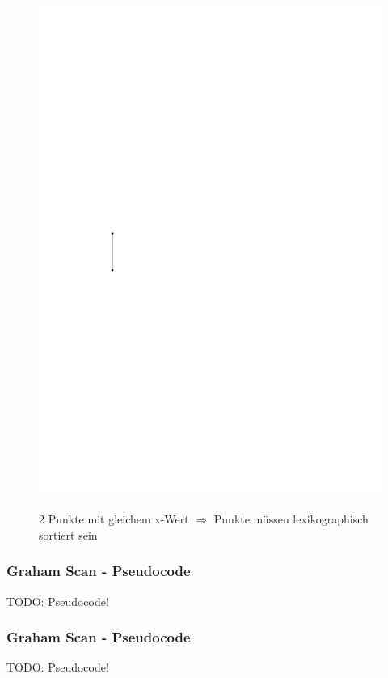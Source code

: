 \begin{frame}
\begin{figure}[htbp]
\begin{minipage}[b]{.4\linewidth}
    \includegraphics[width=\linewidth]{bilder/sonderfall2}
    \\
    \\
    \tiny{2 Punkte mit gleichem x-Wert $\Rightarrow$ Punkte müssen lexikographisch sortiert sein}
    \end{minipage}
\end{figure}


\end{frame}


\begin{frame}
	\frametitle{{Graham Scan - Pseudocode}}
TODO: Pseudocode!
\end{frame}



\begin{frame}
	\frametitle{{Graham Scan - Pseudocode}}
TODO: Pseudocode!
\end{frame}

